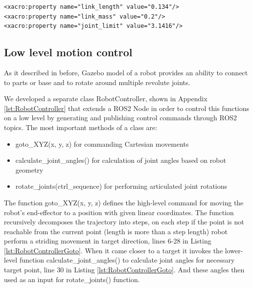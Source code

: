 \begin{lstlisting}[language=xacro, caption={Parameters of a robot in robot.xacro}, label={lst:RobotXacroParams}]
<xacro:property name="link_length" value="0.134"/>
<xacro:property name="link_mass" value="0.2"/>
<xacro:property name="joint_limit" value="3.1416"/>
\end{lstlisting}

\subsection{Low level motion control}


As it described in before, Gazebo model of a robot provides an ability 
to connect to parts or base and to rotate around multiple revolute joints. 

We developed a separate class RobotController, shown in 
Appendix \ref{lst:RobotController} that extends a ROS2 Node 
in order to control this functions on a low level by generating and 
publishing control commands through ROS2 topics. 
The most important methods of a class are: 
\begin{itemize}
    \item  goto\_XYZ(x, y, z) for commanding Cartesian movements
    \item  calculate\_joint\_angles() for calculation of joint angles based on robot geometry
    \item  rotate\_joints(ctrl\_sequence) for performing articulated joint rotations
\end{itemize}

The function goto\_XYZ(x, y, z)  defines the high-level command for moving the 
robot's end-effector to a position with given linear coordinates.
The function recursively decomposes the trajectory into steps, 
on each step if the point is not reachable from the current point (length is more than a step length)
robot perform a striding movement in target direction, lines 6-28 in Listing \ref{lst:RobotControllerGoto}. 
When it came closer to a target it invokes the lower-level function calculate\_joint\_angles() 
to calculate joint angles for necessary target point, line 30 in Listing \ref{lst:RobotControllerGoto}.
And these angles then used as an input for rotate\_joints() function.

